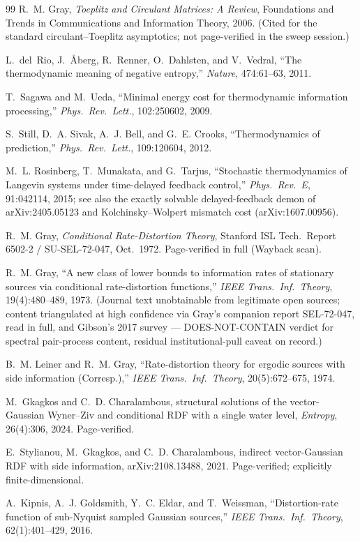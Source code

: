 ﻿\documentclass[11pt]{article}
\theoremstyle{remark}
\begin{document}
\begin{thebibliography}{99}
 R.~M. Gray, \emph{Toeplitz and Circulant
Matrices: A Review}, Foundations and Trends in Communications and
Information Theory, 2006. (Cited for the standard circulant--Toeplitz
asymptotics; not page-verified in the sweep session.)

 L.~del~Rio, J.~{\AA}berg, R.~Renner, O.~Dahlsten, and
V.~Vedral, ``The thermodynamic meaning of negative entropy,''
\emph{Nature}, 474:61--63, 2011.

 T.~Sagawa and M.~Ueda, ``Minimal energy cost for
thermodynamic information processing,'' \emph{Phys.\ Rev.\ Lett.},
102:250602, 2009.

 S.~Still, D.~A. Sivak, A.~J. Bell, and G.~E. Crooks,
``Thermodynamics of prediction,'' \emph{Phys.\ Rev.\ Lett.},
109:120604, 2012.

 M.~L. Rosinberg, T.~Munakata, and G.~Tarjus,
``Stochastic thermodynamics of Langevin systems under time-delayed
feedback control,'' \emph{Phys.\ Rev.\ E}, 91:042114, 2015; see also
the exactly solvable delayed-feedback demon of arXiv:2405.05123 and
Kolchinsky--Wolpert mismatch cost (arXiv:1607.00956).

 R.~M. Gray, \emph{Conditional Rate-Distortion
Theory}, Stanford ISL Tech.\ Report 6502-2 / SU-SEL-72-047, Oct.\
1972. Page-verified in full (Wayback scan).

 R.~M. Gray, ``A new class of lower bounds to
information rates of stationary sources via conditional
rate-distortion functions,'' \emph{IEEE Trans.\ Inf.\ Theory},
19(4):480--489, 1973. (Journal text unobtainable from legitimate open
sources; content triangulated at high confidence via Gray's companion
report SEL-72-047, read in full, and Gibson's 2017 survey ---
DOES-NOT-CONTAIN verdict for spectral pair-process content, residual
institutional-pull caveat on record.)

 B.~M. Leiner and R.~M. Gray, ``Rate-distortion
theory for ergodic sources with side information (Corresp.),''
\emph{IEEE Trans.\ Inf.\ Theory}, 20(5):672--675, 1974.

 M.~Gkagkos and C.~D. Charalambous, structural
solutions of the vector-Gaussian Wyner--Ziv and conditional RDF with a
single water level, \emph{Entropy}, 26(4):306, 2024. Page-verified.

 E.~Stylianou, M.~Gkagkos, and C.~D. Charalambous,
indirect vector-Gaussian RDF with side information, arXiv:2108.13488,
2021. Page-verified; explicitly finite-dimensional.

 A.~Kipnis, A.~J. Goldsmith, Y.~C. Eldar, and
T.~Weissman, ``Distortion-rate function of sub-Nyquist sampled
Gaussian sources,'' \emph{IEEE Trans.\ Inf.\ Theory}, 62(1):401--429,
2016.

\end{thebibliography}
\end{document}
